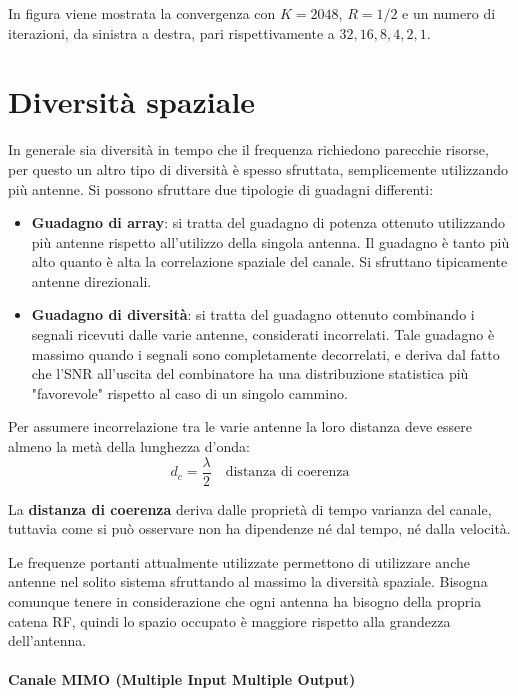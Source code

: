 In figura viene mostrata la convergenza con $K=2048$, $R=1/2$ e un numero di iterazioni, da sinistra a destra, pari rispettivamente a $32, 16, 8, 4, 2, 1$.


\section*{Diversità spaziale}

In generale sia diversità in tempo che il frequenza richiedono parecchie risorse, per questo un altro tipo di diversità è spesso sfruttata, semplicemente utilizzando più antenne. Si possono sfruttare due tipologie di guadagni differenti:
\begin{itemize}
    \item \textbf{Guadagno di array}: si tratta del guadagno di potenza ottenuto utilizzando più antenne rispetto all'utilizzo della singola antenna. Il guadagno è tanto più alto quanto è alta la correlazione spaziale del canale. Si sfruttano tipicamente antenne direzionali.
    \item \textbf{Guadagno di diversità}: si tratta del guadagno ottenuto combinando i segnali ricevuti dalle varie antenne, considerati incorrelati. Tale guadagno è massimo quando i segnali sono completamente decorrelati, e deriva dal fatto che l'SNR all'uscita del combinatore ha una distribuzione statistica più "favorevole" rispetto al caso di un singolo cammino.
\end{itemize} 

Per assumere incorrelazione tra le varie antenne la loro distanza deve essere almeno la metà della lunghezza d'onda:
\[
    d_c = \frac{\lambda}{2} \quad \text{distanza di coerenza}
\]  

La \textbf{distanza di coerenza} deriva dalle proprietà di tempo varianza del canale, tuttavia come si può osservare non ha dipendenze né dal tempo, né dalla velocità.

Le frequenze portanti attualmente utilizzate permettono di utilizzare anche antenne nel solito sistema sfruttando al massimo la diversità spaziale.
Bisogna comunque tenere in considerazione che ogni antenna ha bisogno della propria catena RF, quindi lo spazio occupato è maggiore rispetto alla grandezza dell'antenna.


\paragraph*{Canale MIMO (Multiple Input Multiple Output)}


